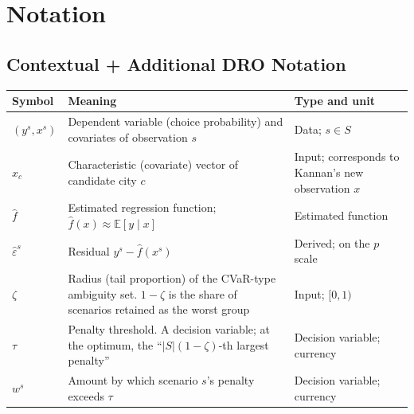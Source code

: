 \documentclass[10pt,a4paper]{article}
\begin{document}
\section{Notation}
\subsection{\textbf{Contextual + Additional DRO Notation}}
{\footnotesize
\begin{longtable}{@{}L{0.14\textwidth}L{0.45\textwidth}L{0.35\textwidth}@{}}
\toprule Symbol & Meaning & Type and unit\\\midrule\endhead\bottomrule\endlastfoot
$(y^s,x^s)$ & Dependent variable (choice probability) and covariates of observation $s$ & Data; $s\in S$\\
$x_c$ & Characteristic (covariate) vector of candidate city $c$ & Input; corresponds to Kannan's new observation $x$\\
$\hat f$ & Estimated regression function; $\hat f(x)\approx\mathbb E[y\mid x]$ & Estimated function\\
$\hat\varepsilon^s$ & Residual $y^s-\hat f(x^s)$ & Derived; on the $p$ scale\\
$\zeta$ & Radius (tail proportion) of the CVaR-type ambiguity set. $1-\zeta$ is the share of scenarios retained as the worst group & Input; $[0,1)$\\
$\tau$ & Penalty threshold. A decision variable; at the optimum, the ``$|S|(1-\zeta)$-th largest penalty'' & Decision variable; currency\\
$w^s$ & Amount by which scenario $s$'s penalty exceeds $\tau$ & Decision variable; currency\\
\end{longtable}}
\end{document}
